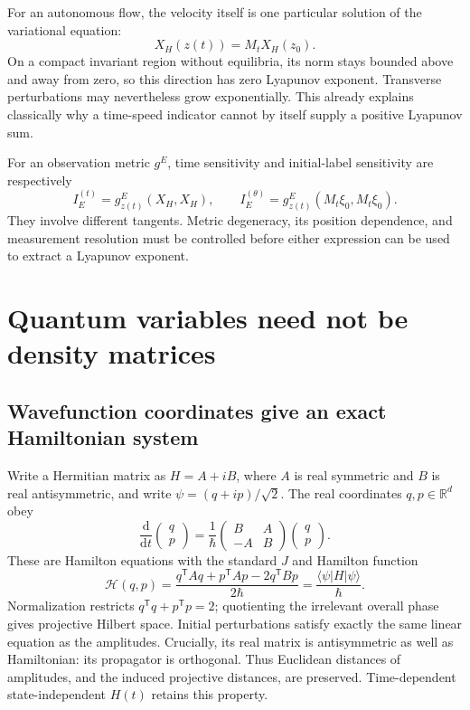 \documentclass[11pt,a4paper]{article}
\newcommand{\dd}{\mathrm{d}}
\begin{document}
For an autonomous flow, the velocity itself is one particular solution of the variational equation:
\[X_H(z(t))=M_tX_H(z_0).\]
On a compact invariant region without equilibria, its norm stays bounded above and away from zero, so this direction has zero Lyapunov exponent. Transverse perturbations may nevertheless grow exponentially. This already explains classically why a time-speed indicator cannot by itself supply a positive Lyapunov sum.

For an observation metric $g^E$, time sensitivity and initial-label sensitivity are respectively
\[I_E^{(t)}=g^E_{z(t)}(X_H,X_H),\qquad I_E^{(\theta)}=g^E_{z(t)}(M_t\xi_0,M_t\xi_0).\]
They involve different tangents. Metric degeneracy, its position dependence, and measurement resolution must be controlled before either expression can be used to extract a Lyapunov exponent.

\section{Quantum variables need not be density matrices}
\subsection{Wavefunction coordinates give an exact Hamiltonian system}
Write a Hermitian matrix as $H=A+iB$, where $A$ is real symmetric and $B$ is real antisymmetric, and write $\psi=(q+ip)/\sqrt2$. The real coordinates $q,p\in\mathbb R^d$ obey
\[\frac{\dd}{\dd t}\begin{pmatrix}q\\p\end{pmatrix}=\frac1\hbar\begin{pmatrix}B&A\\-A&B\end{pmatrix}\begin{pmatrix}q\\p\end{pmatrix}.\]
These are Hamilton equations with the standard $J$ and Hamilton function
\[\mathcal H(q,p)=\frac{q^{\mathsf T}Aq+p^{\mathsf T}Ap-2q^{\mathsf T}Bp}{2\hbar}=\frac{\langle\psi|H|\psi\rangle}{\hbar}.\]
Normalization restricts $q^{\mathsf T}q+p^{\mathsf T}p=2$; quotienting the irrelevant overall phase gives projective Hilbert space. Initial perturbations satisfy exactly the same linear equation as the amplitudes. Crucially, its real matrix is antisymmetric as well as Hamiltonian: its propagator is orthogonal. Thus Euclidean distances of amplitudes, and the induced projective distances, are preserved. Time-dependent state-independent $H(t)$ retains this property.
\end{document}
